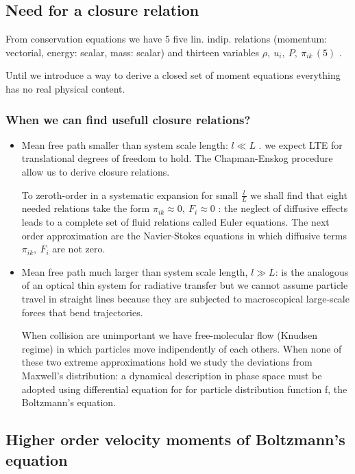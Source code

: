 \documentclass[main.tex]{subfiles}
\newcommand{\mblock}[1]{ {\allowbreak $#1$ }}
\begin{document}
\subsection{Need for a closure relation}

From conservation equations we have 5 five lin. indip. relations (momentum: vectorial, energy: scalar, mass: scalar) and thirteen variables \mblock{\rho,\ u_i,\ P,\ \pi_{ik}\,(5)}.

Until we introduce a way to derive a closed set of moment equations everything has no real physical content.

\subsubsection{When we can find usefull closure relations?}

\begin{itemize}
\item Mean free path smaller than system scale length: \mblock{l\ll L}. we expect LTE for translational degrees of freedom to hold. The Chapman-Enskog procedure allow us to derive closure relations.

To zeroth-order in a systematic expansion for small $\frac{l}{L}$ we shall find that eight needed relations take the form \mblock{\pi_{ik}\approx0,\ F_i\approx0}: the neglect of diffusive effects leads to a complete set of fluid relations called Euler equations. The next order approximation are the Navier-Stokes equations in which diffusive terms \mblock{\pi_{ik},\ F_i} are not zero.

\item Mean free path much larger than system scale length, $l\gg L$: is the analogous of an optical thin system for radiative transfer but we cannot assume particle travel in straight lines because they are subjected to macroscopical large-scale forces that bend trajectories.

When collision are unimportant we have free-molecular flow (Knudsen regime) in which particles move indipendently of each others. When none of these two extreme approximations hold we study the deviations from Maxwell's distribution: a dynamical description in phase space must be adopted using differential equation for for particle distribution function f, the Boltzmann's equation.

\end{itemize}

\subsection{Higher order velocity moments of Boltzmann's equation}
\end{document}
